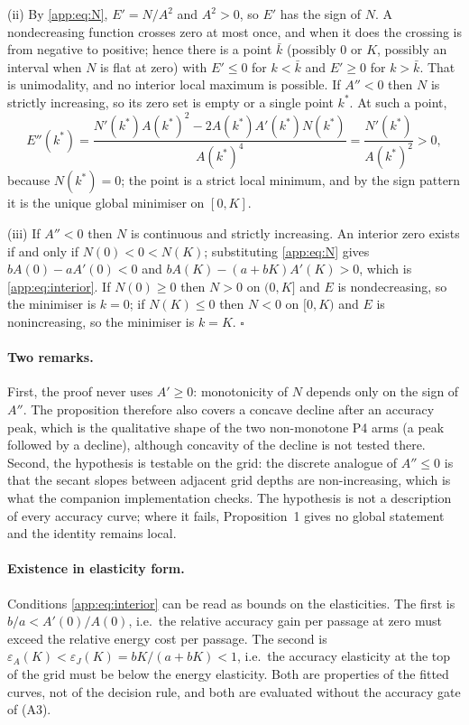 (ii) By \eqref{app:eq:N}, $E'=N/A^{2}$ and $A^{2}>0$, so $E'$ has the sign of
$N$. A nondecreasing function crosses zero at most once, and when it does the
crossing is from negative to positive; hence there is a point $\bar k$ (possibly
$0$ or $K$, possibly an interval when $N$ is flat at zero) with $E'\le0$ for
$k<\bar k$ and $E'\ge0$ for $k>\bar k$. That is unimodality, and no interior local
maximum is possible. If $A''<0$ then $N$ is strictly increasing, so its zero set
is empty or a single point $k^{*}$. At such a point,
\begin{equation}\label{app:eq:Esecond}
  E''(k^{*})=\frac{N'(k^{*})A(k^{*})^{2}-2A(k^{*})A'(k^{*})N(k^{*})}{A(k^{*})^{4}}
  =\frac{N'(k^{*})}{A(k^{*})^{2}}>0,
\end{equation}
because $N(k^{*})=0$; the point is a strict local minimum, and by the sign pattern
it is the unique global minimiser on $[0,K]$.

(iii) If $A''<0$ then $N$ is continuous and strictly increasing. An interior zero
exists if and only if $N(0)<0<N(K)$; substituting \eqref{app:eq:N} gives
$bA(0)-aA'(0)<0$ and $bA(K)-(a+bK)A'(K)>0$, which is \eqref{app:eq:interior}.
If $N(0)\ge0$ then $N>0$ on $(0,K]$ and $E$ is nondecreasing, so the minimiser is
$k=0$; if $N(K)\le0$ then $N<0$ on $[0,K)$ and $E$ is nonincreasing, so the
minimiser is $k=K$. \hfill$\square$

\paragraph{Two remarks.} First, the proof never uses $A'\ge0$: monotonicity of
$N$ depends only on the sign of $A''$. The proposition therefore also covers a
concave decline after an accuracy peak, which is the qualitative shape of the two
non-monotone P4 arms (a peak followed by a decline), although concavity of the
decline is not tested there. Second, the hypothesis is testable on the grid: the discrete
analogue of $A''\le0$ is that the secant slopes between adjacent grid depths are
non-increasing, which is what the companion implementation checks. The hypothesis
is not a description of every accuracy curve; where it fails, Proposition~1 gives
no global statement and the identity remains local.

\paragraph{Existence in elasticity form.} Conditions \eqref{app:eq:interior} can
be read as bounds on the elasticities. The first is
$b/a<A'(0)/A(0)$, i.e.\ the relative accuracy gain per passage at zero must exceed
the relative energy cost per passage. The second is
$\varepsilon_{A}(K)<\varepsilon_{J}(K)=bK/(a+bK)<1$, i.e.\ the accuracy
elasticity at the top of the grid must be below the energy elasticity. Both are
properties of the fitted curves, not of the decision rule, and both are evaluated
without the accuracy gate of (A3).

